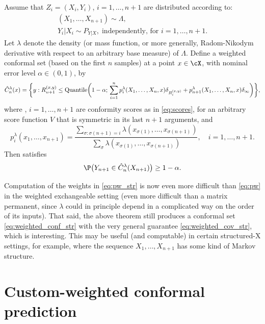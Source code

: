 \documentclass{article}
\begin{document}
\begin{theorem}
\label{thm:weighted_conf_str}
Assume that $Z_i=(X_i,Y_i)$, $i=1,\dots,n+1$ are distributed according to:
\begin{gather*}
(X_1,\dots,X_{n+1}) \sim \Lambda, \\
Y_i|X_i \sim P_{Y|X}, \; \text{independently, for $i=1,\dots,n+1$}.
\end{gather*}
Let $\lambda$ denote the density (or mass function, or more generally,
Radom-Nikodym derivative with respect to an arbitrary base measure) of
$\Lambda$. Define a weighted conformal set (based on the first $n$ samples) at a
point $x \in \cX$, with nominal error level $\alpha \in (0,1)$, by   
\begin{equation}
\label{eq:weighted_conf_str}
\hat{C}^\lambda_n(x) = \bigg\{ y : R_{n+1}^{(x,y)} \leq \mathrm{Quantile}\bigg( 1-\alpha;  
\, \sum_{i=1}^n p^\lambda_i(X_1,\dots,X_n,x) \delta_{R_i^{(x,y)}} +
p^\lambda_{n+1}(X_1,\dots,X_n,x) \delta_\infty \bigg) \bigg\},   
\end{equation}
where , $i=1,\ldots,n+1$ are conformity scores as in
\eqref{eq:scores}, for an arbitrary score function $V$ that is symmetric in its 
last $n+1$ arguments, and
\begin{equation}
\label{eq:pw_str}
p^\lambda_i(x_1,\dots,x_{n+1}) = 
\frac{\sum_{\sigma : \sigma(n+1)=i} \lambda(x_{\sigma(1)},\dots,
  x_{\sigma(n+1)})} {\sum_\sigma \lambda(x_{\sigma(1)},\dots, x_{\sigma(n+1)})},
\quad i=1,\dots,n+1.  
\end{equation}
Then  satisfies 
\begin{equation}
\label{eq:weighted_cov_str}
\P\big( Y_{n+1} \in \hC^\lambda_n(X_{n+1}) \big) \geq 1-\alpha. 
\end{equation}
\end{theorem}

Computation of the weights in \eqref{eq:pw_str} is now even more difficult than
\eqref{eq:pw} in the weighted exchangeable setting (even more difficult than a
matrix permanent, since $\lambda$ could in principle depend in a complicated way
on the order of its inputs). That said, the above theorem still produces a
conformal set \eqref{eq:weighted_conf_str} with the very general guarantee
\eqref{eq:weighted_cov_str}, which is interesting. This may be useful (and
computable) in certain structured-X settings, for example, where the sequence
$X_1,\dots,X_{n+1}$ has some kind of Markov structure.

\section{Custom-weighted conformal prediction}
\end{document}
